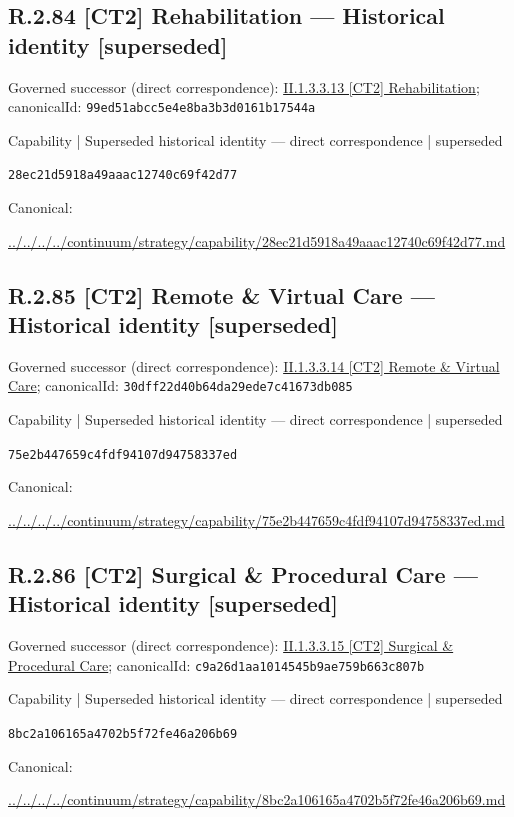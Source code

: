 \documentclass[10pt,a4paper]{article}
\begin{document}
\subsection*{R.2.84 [CT2] Rehabilitation — Historical identity [superseded]}
Governed successor (direct correspondence): \hyperref[element-99ed51abcc5e4e8ba3b3d0161b17544a]{II.1.3.3.13 [CT2] Rehabilitation}; canonicalId: \texttt{99ed51abcc5e4e8ba3b3d0161b17544a}\par
\label{element-28ec21d5918a49aaac12740c69f42d77}
{\small Capability | Superseded historical identity — direct correspondence | superseded}\par
\texttt{28ec21d5918a49aaac12740c69f42d77}\par
Canonical: \par
{\footnotesize\url{../../../../continuum/strategy/capability/28ec21d5918a49aaac12740c69f42d77.md}}\par
\subsection*{R.2.85 [CT2] Remote \& Virtual Care — Historical identity [superseded]}
Governed successor (direct correspondence): \hyperref[element-30dff22d40b64da29ede7c41673db085]{II.1.3.3.14 [CT2] Remote \& Virtual Care}; canonicalId: \texttt{30dff22d40b64da29ede7c41673db085}\par
\label{element-75e2b447659c4fdf94107d94758337ed}
{\small Capability | Superseded historical identity — direct correspondence | superseded}\par
\texttt{75e2b447659c4fdf94107d94758337ed}\par
Canonical: \par
{\footnotesize\url{../../../../continuum/strategy/capability/75e2b447659c4fdf94107d94758337ed.md}}\par
\subsection*{R.2.86 [CT2] Surgical \& Procedural Care — Historical identity [superseded]}
Governed successor (direct correspondence): \hyperref[element-c9a26d1aa1014545b9ae759b663c807b]{II.1.3.3.15 [CT2] Surgical \& Procedural Care}; canonicalId: \texttt{c9a26d1aa1014545b9ae759b663c807b}\par
\label{element-8bc2a106165a4702b5f72fe46a206b69}
{\small Capability | Superseded historical identity — direct correspondence | superseded}\par
\texttt{8bc2a106165a4702b5f72fe46a206b69}\par
Canonical: \par
{\footnotesize\url{../../../../continuum/strategy/capability/8bc2a106165a4702b5f72fe46a206b69.md}}\par
\end{document}
